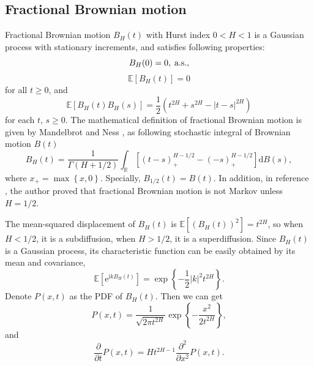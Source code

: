 \documentclass[aps, pre, preprint, amsmath, amssymb]{revtex4}
\newcommand{\e}{\mathrm{e}}
\newcommand{\I}{\mathrm{i}}
\newcommand{\R}{\mathbb{R}}
\newcommand{\E}{\mathbb{E}}
\renewcommand{\d}{\mathrm{d}}
\newcommand{\xiaokuo}[1]{\left(#1\right)}
\newcommand{\zhongkuo}[1]{\left[#1\right]}
\newcommand{\dakuo}[1]{\left\{#1\right\}}
\begin{document}
\subsection{Fractional Brownian motion}
Fractional Brownian motion \cite{decreusefond1999stochastic, dieker2004simulation, rogers1997arbitrage, biagini2008stochastic, mandelbrot1960pareto} $B_{H}(t)$ with Hurst index $0<H<1$ is a Gaussian process with stationary increments, and satisfies following properties: 
\begin{equation}
	B_{H}(0)=0, \textnormal{\;a.s.},
\end{equation}
\begin{equation}
	\E\zhongkuo{B_{H}(t)}=0
\end{equation}
for all $t\geqslant 0$,
and
\begin{equation}
	\E\zhongkuo{B_{H}(t)B_{H}(s)}=\frac{1}{2}\xiaokuo{t^{2H}+s^{2H}-|t-s|^{2H}}
\end{equation}
for each $t$, $s\geqslant 0$. 
The mathematical definition of fractional Brownian motion is given by Mandelbrot and Ness \cite{mandelbrot1960pareto}, as following stochastic integral of Brownian motion $B(t)$
\begin{equation}
B_{H}(t)=\frac{1}{\Gamma(H+1/2)}\int_{\R}\zhongkuo{\xiaokuo{t-s}_{+}^{H-1/2}-\xiaokuo{-s}_{+}^{H-1/2}}\d B(s),
\end{equation}
where $x_{+}=\max\dakuo{x, 0}$. Specially, $B_{1/2}(t)=B(t)$. In addition, in reference \cite{huy2003remark}, the author proved that fractional Brownian motion is not Markov unless $H=1/2$.

The mean-squared displacement of $B_{H}(t)$ is $\E\zhongkuo{\xiaokuo{B_H(t)}^2}=t^{2H}$, so when $H<1/2$, it is a subdiffusion, when $H>1/2$, it is a superdiffusion. 
Since $B_{H}(t)$ is a Gaussian process, its characteristic function can be easily obtained by its mean and covariance, 
\begin{equation}
\E\zhongkuo{\e^{\I kB_{H}(t)}}=\exp{\dakuo{-\frac{1}{2}|k|^2t^{2H}}}.
\end{equation}
Denote $P(x,t)$ as the PDF of $B_{H}(t)$. 
Then we can get 
\begin{equation}
P(x,t)=\frac{1}{\sqrt{2\pi t^{2H}}}\exp{\dakuo{-\frac{x^2}{2t^{2H}}}},
\end{equation}
and
\begin{equation}
\frac{\partial}{\partial t}P(x,t)=Ht^{2H-1}\frac{\partial^2}{\partial x^2}P(x,t).
\end{equation}
\end{document}
